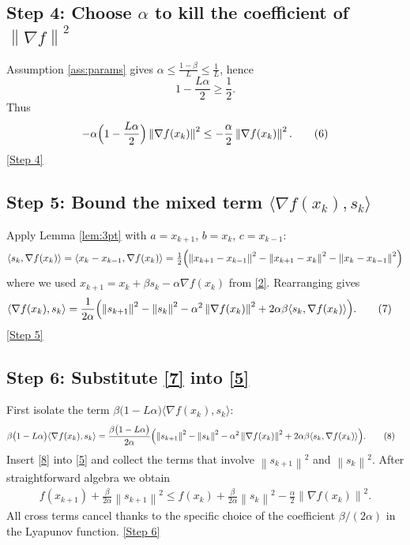 \documentclass{article}
\newcommand{\norm}[1]{\left\lVert#1\right\rVert}
\begin{document}
\subsection*{Step 4: Choose $\alpha$ to kill the coefficient of $\norm{\nabla f}^{2}$}
Assumption \ref{ass:params} gives $\alpha\le\frac{1-\beta}{L}\le\frac{1}{L}$, hence
\[
1-\frac{L\alpha}{2}\ge\frac{1}{2}.
\]
Thus
\begin{equation}
-\alpha\Bigl(1-\frac{L\alpha}{2}\Bigr)\norm{\nabla f(x_{k})}^{2}
\le -\frac{\alpha}{2}\norm{\nabla f(x_{k})}^{2}. \tag{6}
\end{equation}
\underline{[Step 4]}

\subsection*{Step 5: Bound the mixed term $\langle\nabla f(x_{k}),s_{k}\rangle$}
Apply Lemma \ref{lem:3pt} with $a=x_{k+1}$, $b=x_{k}$, $c=x_{k-1}$:
\[
\langle s_{k},\nabla f(x_{k})\rangle
= \langle x_{k}-x_{k-1},\nabla f(x_{k})\rangle
= \tfrac12\Bigl(\norm{x_{k+1}-x_{k-1}}^{2}
               -\norm{x_{k+1}-x_{k}}^{2}
               -\norm{x_{k}-x_{k-1}}^{2}\Bigr)
\]
where we used $x_{k+1}=x_{k}+\beta s_{k}-\alpha\nabla f(x_{k})$ from \eqref{2}.  Rearranging gives
\begin{align}
\langle\nabla f(x_{k}),s_{k}\rangle
&= \frac{1}{2\alpha}\Bigl(\norm{s_{k+1}}^{2}-\norm{s_{k}}^{2}
                         -\alpha^{2}\norm{\nabla f(x_{k})}^{2}
                         +2\alpha\beta\langle s_{k},\nabla f(x_{k})\rangle\Bigr). \tag{7}
\end{align}
\underline{[Step 5]}

\subsection*{Step 6: Substitute \eqref{7} into \eqref{5}}
First isolate the term $\beta\bigl(1-L\alpha\bigr)\langle\nabla f(x_{k}),s_{k}\rangle$:
\begin{align}
\beta\bigl(1-L\alpha\bigr)\langle\nabla f(x_{k}),s_{k}\rangle
&= \frac{\beta\bigl(1-L\alpha\bigr)}{2\alpha}
   \Bigl(\norm{s_{k+1}}^{2}-\norm{s_{k}}^{2}
        -\alpha^{2}\norm{\nabla f(x_{k})}^{2}
        +2\alpha\beta\langle s_{k},\nabla f(x_{k})\rangle\Bigr). \tag{8}
\end{align}
Insert \eqref{8} into \eqref{5} and collect the terms that involve $\norm{s_{k+1}}^{2}$ and $\norm{s_{k}}^{2}$.  After straightforward algebra we obtain
\begin{align}
f(x_{k+1})+\frac{\beta}{2\alpha}\norm{s_{k+1}}^{2}
\le
f(x_{k})+\frac{\beta}{2\alpha}\norm{s_{k}}^{2}
-\frac{\alpha}{2}\norm{\nabla f(x_{k})}^{2}. \tag{9}
\end{align}
All cross terms cancel thanks to the specific choice of the coefficient $\beta/(2\alpha)$ in the Lyapunov function.  
\underline{[Step 6]}
\end{document}
